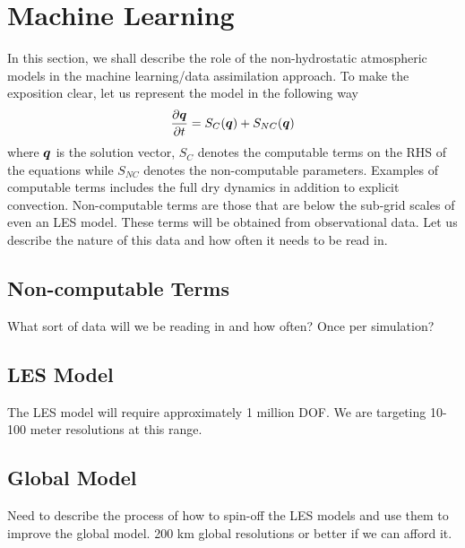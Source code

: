 
\section{Machine Learning}
\label{sec:machine_learning}

In this section, we shall describe the role of the non-hydrostatic atmospheric models in the machine learning/data assimilation approach.  To make the exposition clear, let us represent the model in the following way
\[
\frac{\partial \mbox{\boldmath$q$\unboldmath}}{\partial t} = S_C(\mbox{\boldmath$q$\unboldmath}) + S_{NC}(\mbox{\boldmath$q$\unboldmath})
\]
where $\mbox{\boldmath$q$\unboldmath}$ is the solution vector, $S_C$ denotes the computable terms on the RHS of the equations while $S_{NC}$ denotes the non-computable parameters.  Examples of computable terms includes the full dry dynamics in addition to explicit convection.  Non-computable terms are those that are below the sub-grid scales of even an LES model.  These terms will be obtained from observational data.  Let us describe the nature of this data and how often it needs to be read in.

\subsection{Non-computable Terms}
What sort of data will we be reading in and how often? Once per simulation?  

\subsection{LES Model}
The LES model will require approximately 1 million DOF.  We are targeting 10-100 meter resolutions at this range.

\subsection{Global Model}
Need to describe the process of how to spin-off the LES models and use them to improve the global model. 200 km global resolutions or better if we can afford it. 